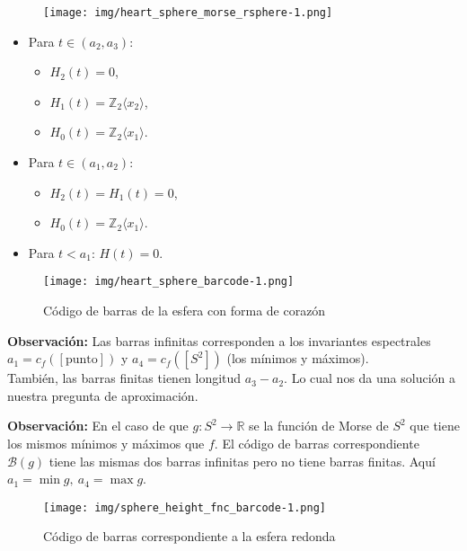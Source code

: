 \documentclass{beamer}
\newcommand{\calB}{{\mathcal{B}}}
\def\R{\mathbb{R}}
\def\Z{\mathbb{Z}}
\begin{document}
\begin{frame}{}
    \begin{figure}[!ht]
	\centering
	\texttt{[image: img/heart\_sphere\_morse\_rsphere-1.png]}

	\label{fig: heart_sphere_morse_rsphere}
\end{figure}
    \begin{itemize}
        \item
		Para $t\in (a_2, a_3)$:
  \begin{itemize}
      \item $H_2 (t) = 0$,
      \item $H_1 (t) = \Z_2 \langle x_2 \rangle$,
      \item $H_0 (t) = \Z_2 \langle x_1 \rangle$. \\[0.2cm] \pause
  \end{itemize}
	\item
		Para $t\in (a_1, a_2)$:
  \begin{itemize}
      \item $H_2 (t) = H_1 (t) = 0$,
      \item  $H_0 (t) = \Z_2 \langle x_1 \rangle$.\\[0.2cm]\pause
  \end{itemize}
	\item
		Para $t < a_1$:
		$H (t) = 0$.
    \end{itemize}

\end{frame}

\begin{frame}{}
    \begin{figure}[!ht]
	\centering
	\texttt{[image: img/heart\_sphere\_barcode-1.png]}
	\caption{Código de barras de la esfera con forma de corazón}
	\label{fig: heart_sphere_barcode}
\end{figure}

\textbf{{\color{yellow}Observación:}} Las barras infinitas corresponden a los invariantes espectrales $a_1 = c_f ([\text{punto}])$ y $a_4 = c_f ([S^2])$ (los mínimos y máximos). \\[0.3cm] \pause 
También, las barras finitas tienen longitud $a_3 - a_2$. Lo cual nos da una solución a nuestra pregunta de aproximación.
\end{frame}

\begin{frame}{}
\textbf{{\color{yellow}Observación:}} En el caso de que $g: S^2 \to \R$ se la función de Morse de $S^2$ que tiene los mismos mínimos y máximos que $f$. El código de barras correspondiente $\calB (g)$ tiene las mismas dos barras infinitas pero no tiene barras finitas. Aquí $a_1 = \min g,\ a_4 = \max g$.

\begin{figure}[!ht]
	\centering
	\texttt{[image: img/sphere\_height\_fnc\_barcode-1.png]}
	\caption{Código de barras correspondiente a la esfera redonda}
	\label{fig: sphere_height_fnc_barcode}
\end{figure}
\end{frame}
\end{document}
